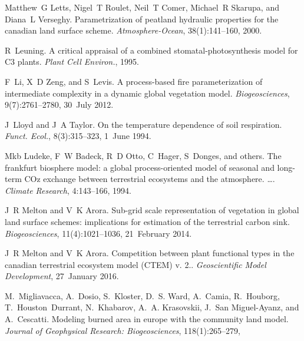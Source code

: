 \begin{DoxyDescription}
\item[\label{_CITEREF_Letts2000-pg}%
\mbox{[}49\mbox{]}]Matthew~G Letts, Nigel~T Roulet, Neil~T Comer, Michael~R Skarupa, and Diana~L Verseghy. Parametrization of peatland hydraulic properties for the canadian land surface scheme. {\itshape Atmosphere-\/\+Ocean}, 38(1)\+:141--160, 2000. 


\item[\label{_CITEREF_Leuning1995-ab}%
\mbox{[}50\mbox{]}]R~Leuning. A critical appraisal of a combined stomatal-\/photosynthesis model for C3 plants. {\itshape Plant Cell Environ.}, 1995.


\item[\label{_CITEREF_Li20121c2}%
\mbox{[}51\mbox{]}]F~Li, X~D Zeng, and S~Levis. A process-\/based fire parameterization of intermediate complexity in a dynamic global vegetation model. {\itshape Biogeosciences}, 9(7)\+:2761--2780, 30~July 2012. 


\item[\label{_CITEREF_Lloyd1994-ct}%
\mbox{[}52\mbox{]}]J~Lloyd and J~A Taylor. On the temperature dependence of soil respiration. {\itshape Funct. Ecol.}, 8(3)\+:315--323, 1~June 1994. 


\item[\label{_CITEREF_Ludeke1994-px}%
\mbox{[}53\mbox{]}]Mkb Ludeke, F~W Badeck, R~D Otto, C~Hager, S~Donges, and others. The frankfurt biosphere model\+: a global process-\/oriented model of seasonal and long-\/term C\+Oz exchange between terrestrial ecosystems and the atmosphere. …. {\itshape Climate Research}, 4\+:143--166, 1994.


\item[\label{_CITEREF_Melton2014-xy}%
\mbox{[}54\mbox{]}]J~R Melton and V~K Arora. Sub-\/grid scale representation of vegetation in global land surface schemes\+: implications for estimation of the terrestrial carbon sink. {\itshape Biogeosciences}, 11(4)\+:1021--1036, 21~February 2014. 


\item[\label{_CITEREF_Melton2016-zx}%
\mbox{[}55\mbox{]}]J~R Melton and V~K Arora. Competition between plant functional types in the canadian terrestrial ecosystem model (C\+T\+E\+M) v. 2.. {\itshape Geoscientific Model Development}, 27~January 2016. 


\item[\label{_CITEREF_Migliavacca2013-eh}%
\mbox{[}56\mbox{]}]M.~Migliavacca, A.~Dosio, S.~Kloster, D.~S. Ward, A.~Camia, R.~Houborg, T.~Houston~Durrant, N.~Khabarov, A.~A. Krasovskii, J.~San Miguel-\/\+Ayanz, and A.~Cescatti. Modeling burned area in europe with the community land model. {\itshape Journal of Geophysical Research\+: Biogeosciences}, 118(1)\+:265--279,
\begin{DoxyEnumerate}
\item 
\end{DoxyEnumerate}



\end{DoxyDescription}
